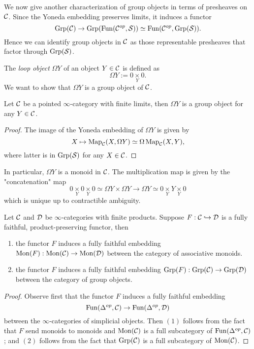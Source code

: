 We now give another characterization of group objects in terms of presheaves on ${\mathcal{C}}$.
Since the Yoneda embedding preserves limits, it induces a functor
$$
\operatorname{Grp}({\mathcal{C}}) \to  \operatorname{Grp}(\operatorname{Fun}({\mathcal{C}}^{op}, \operatorname{\mathcal{S}})) \simeq \operatorname{Fun}({\mathcal{C}}^{op}, \operatorname{Grp}(\operatorname{\mathcal{S}})).
$$
Hence we can identify group objects in ${\mathcal{C}}$ as those representable presheaves that factor through $\operatorname{Grp}(\operatorname{\mathcal{S}})$. 

The \emph{loop object} $\Omega Y$ of an object $Y\in {\mathcal{C}}$ is defined as
$$
\Omega Y:=0 \underset { Y }{\times } 0.
$$
We want to show that $\Omega Y$ is a group object of ${\mathcal{C}}$. 
\begin{lemma}
\label{Loop of an object is a group}
    Let ${\mathcal{C}}$ be a pointed $\infty$-category with finite limits, then $\Omega Y$ is a group object for any $Y\in {\mathcal{C}}$.
\end{lemma}
\begin{proof}
    The image of the Yoneda embedding of $\Omega Y$ is given by 
    $$
    X \mapsto \operatorname{Map}_{{\mathcal{C}}}(X, \Omega Y)\simeq \Omega \operatorname{Map}_{{\mathcal{C}}}(X, Y),
    $$
    where latter is in $\operatorname{Grp}(\operatorname{\mathcal{S}})$ for any $X\in {\mathcal{C}}$.
\end{proof}
\begin{remark}
In particular, $\Omega Y$ is a monoid in ${\mathcal{C}}$. The multiplication map is given by the "concatenation" map
$$
0 \underset { Y }{\times } 0 \underset { Y }{\times } 0
\simeq\Omega Y\times \Omega Y\rightarrow \Omega Y\simeq 0\underset{Y}{\times}Y\underset{Y}{\times} 0 
$$
which is unique up to contractible ambiguity. 
\end{remark}


\begin{proposition}
\label{induced fully faithfulness on group objects}
Let ${\mathcal{C}}$ and ${\mathcal{D}}$ be $\infty$-categories with finite products. Suppose $F:{\mathcal{C}} \hookrightarrow {\mathcal{D}}$ is a fully faithful, product-preserving functor, then
	\begin{enumerate}[(1)]
		\item the functor $F$ induces a fully faithful embedding $\operatorname{Mon}(F):\operatorname{Mon}({\mathcal{C}})\to \operatorname{Mon}({\mathcal{D}})$ between the category of associative monoids.
		\item the functor $F$ induces a fully faithful embedding $\operatorname{Grp}(F):\operatorname{Grp}({\mathcal{C}})\to \operatorname{Grp}({\mathcal{D}})$ between the category of group objects.
	\end{enumerate}
\end{proposition}
\begin{proof}
	Observe first that the functor $F$ induces a fully faithful embedding 
	$$
	\operatorname{Fun}(\Delta^{op},{\mathcal{C}})\to \operatorname{Fun}(\Delta^{op},{\mathcal{D}})
	$$ between the $\infty$-categories of simplicial objects.
	Then $(1)$ follows from the fact that $F$ send monoids to monoids and $\operatorname{Mon}({\mathcal{C}})$ is a full subcategory of $\operatorname{Fun}(\Delta^{op},{\mathcal{C}})$; and $(2)$ follows from the fact that $\operatorname{Grp}({\mathcal{C}})$ is a full subcategory of $\operatorname{Mon}({\mathcal{C}})$.
\end{proof}








